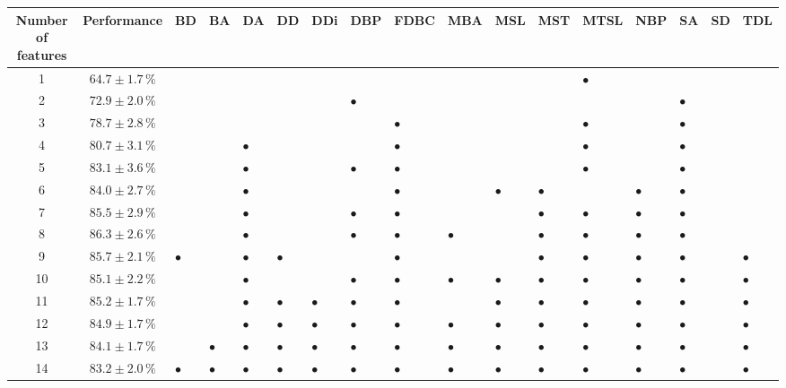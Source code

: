 \documentclass[11pt]{article}
\begin{document}
\begin{sidewaystable}
\begin{tabular}{cclllllllllllllll}
Number of features & Performance  & BD & BA & DA & DD & DDi & DBP & FDBC & MBA & MSL & MST & MTSL & NBP & SA & SD & TDL\\
\hline
1 & $64.7 \pm 1.7\,\%$  &  &  &  &  &  &  &  &  &  &  & $\bullet$ &  &  &  & \\
2 & $72.9 \pm 2.0\,\%$  &  &  &  &  &  & $\bullet$ &  &  &  &  &  &  & $\bullet$ &  & \\
3 & $78.7 \pm 2.8\,\%$  &  &  &  &  &  &  & $\bullet$ &  &  &  & $\bullet$ &  & $\bullet$ &  & \\
4 & $80.7 \pm 3.1\,\%$  &  &  & $\bullet$ &  &  &  & $\bullet$ &  &  &  & $\bullet$ &  & $\bullet$ &  & \\
5 & $83.1 \pm 3.6\,\%$  &  &  & $\bullet$ &  &  & $\bullet$ & $\bullet$ &  &  &  & $\bullet$ &  & $\bullet$ &  & \\
6 & $84.0 \pm 2.7\,\%$  &  &  & $\bullet$ &  &  &  & $\bullet$ &  & $\bullet$ & $\bullet$ &  & $\bullet$ & $\bullet$ &  & \\
7 & $85.5 \pm 2.9\,\%$  &  &  & $\bullet$ &  &  & $\bullet$ & $\bullet$ &  &  & $\bullet$ & $\bullet$ & $\bullet$ & $\bullet$ &  & \\
8 & $86.3 \pm 2.6\,\%$  &  &  & $\bullet$ &  &  & $\bullet$ & $\bullet$ & $\bullet$ &  & $\bullet$ & $\bullet$ & $\bullet$ & $\bullet$ &  & \\
9 & $85.7 \pm 2.1\,\%$  & $\bullet$ &  & $\bullet$ & $\bullet$ &  &  & $\bullet$ &  &  & $\bullet$ & $\bullet$ & $\bullet$ & $\bullet$ &  & $\bullet$\\
10 & $85.1 \pm 2.2\,\%$  &  &  & $\bullet$ &  &  & $\bullet$ & $\bullet$ & $\bullet$ & $\bullet$ & $\bullet$ & $\bullet$ & $\bullet$ & $\bullet$ &  & $\bullet$\\
11 & $85.2 \pm 1.7\,\%$  &  &  & $\bullet$ & $\bullet$ & $\bullet$ & $\bullet$ & $\bullet$ &  & $\bullet$ & $\bullet$ & $\bullet$ & $\bullet$ & $\bullet$ &  & $\bullet$\\
12 & $84.9 \pm 1.7\,\%$  &  &  & $\bullet$ & $\bullet$ & $\bullet$ & $\bullet$ & $\bullet$ & $\bullet$ & $\bullet$ & $\bullet$ & $\bullet$ & $\bullet$ & $\bullet$ &  & $\bullet$\\
13 & $84.1 \pm 1.7\,\%$  &  & $\bullet$ & $\bullet$ & $\bullet$ & $\bullet$ & $\bullet$ & $\bullet$ & $\bullet$ & $\bullet$ & $\bullet$ & $\bullet$ & $\bullet$ & $\bullet$ &  & $\bullet$\\
14 & $83.2 \pm 2.0\,\%$  & $\bullet$ & $\bullet$ & $\bullet$ & $\bullet$ & $\bullet$ & $\bullet$ & $\bullet$ & $\bullet$ & $\bullet$ & $\bullet$ & $\bullet$ & $\bullet$ & $\bullet$ &  & $\bullet$\\

\end{tabular}
\end{sidewaystable}
\end{document}
